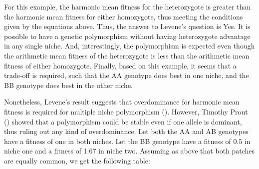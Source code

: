 \documentclass[
  american,
  letterpaper,
]{book}
\begin{document}
For this example, the harmonic mean fitness for the heterozygote is
greater than the harmonic mean fitness for either homozygote, thus
meeting the conditions given by the equations above. Thus, the answer to
Levene's question is Yes. It is possible to have a genetic polymorphism
without having heterozygote advantage in any single niche. And,
interestingly, the polymorphism is expected even though the arithmetic
mean fitness of the heterozygote is less than the arithmetic mean
fitness of either homozygote. Finally, based on this example, it seems
that a trade-off is required, such that the AA genotype does best in one
niche, and the BB genotype does best in the other niche.

Nonetheless, Levene's result suggests that overdominance for harmonic
mean fitness is required for multiple niche polymorphism
(). However, Timothy Prout
() showed that a polymorphism could be
stable even if one allele is dominant, thus ruling out any kind of
overdominance. Let both the AA and AB genotypes have a fitness of one in
both niches. Let the BB genotype have a fitness of 0.5 in niche one and
a fitness of 1.67 in niche two. Assuming as above that both patches are
equally common, we get the following table:
\end{document}

